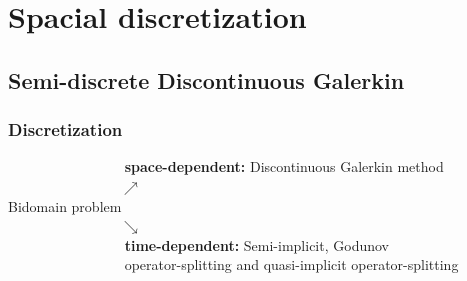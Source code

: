 \documentclass[8pt]{beamer}
\begin{document}
\section{Spacial discretization}

\subsection{Semi-discrete Discontinuous Galerkin}
\begin{frame}
	\frametitle{Discretization}
	$\qquad \qquad \qquad \qquad $ \textbf{space-dependent:} Discontinuous Galerkin method\\\vspace{2mm}
	$\qquad \qquad \qquad \qquad \nearrow$\\
	Bidomain problem\\
	$\qquad \qquad \qquad \qquad \searrow$\\\vspace{2mm}
	$\qquad \qquad \qquad \qquad $ \textbf{time-dependent:} Semi-implicit, Godunov\\ $\qquad \qquad \qquad \qquad $ operator-splitting and quasi-implicit operator-splitting
\end{frame}
\end{document}
